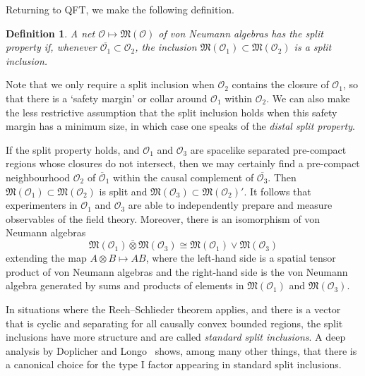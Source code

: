 \documentclass[12pt,a4paper]{article}
\newcommand{\1}{\mathds{1}}                         %
\newcommand{\Ocal}{\mathcal{O}}
\newcommand{\Mf}{{\mathfrak{M}}}
\newtheorem{definition}[theorem]{Definition}
\begin{document}
Returning to QFT, we make the following definition.
\begin{definition}
	A net $\Ocal\mapsto\Mf(\Ocal)$ of von Neumann algebras has the \emph{split property} if, whenever $\overline{\Ocal_1}\subset \Ocal_2$, the inclusion $\Mf(\Ocal_1)\subset \Mf(\Ocal_2)$ is a split inclusion. 
\end{definition}
Note that we only require a split inclusion when $\Ocal_2$ contains the closure of $\Ocal_1$, so that there is a `safety margin' or collar around $\Ocal_1$ within $\Ocal_2$. We can also make the less restrictive assumption that the split inclusion holds when this safety margin has a minimum size, in which case one speaks of the \emph{distal split property}. 

If the split property holds, and $\Ocal_1$ and $ \Ocal_3$ are spacelike separated pre-compact regions whose closures do not intersect, then we may certainly find a pre-compact neighbourhood $\Ocal_2$ of $\overline{\Ocal}_1$ within the causal complement of $\overline{\Ocal_3}$. Then $\Mf(\Ocal_1)\subset \Mf(\Ocal_2)$ is split and $\Mf( \Ocal_3)\subset \Mf(\Ocal_2)'$. It follows that experimenters in $\Ocal_1$ and $ \Ocal_3$ are able to independently prepare and measure observables of the field theory. Moreover, there is an isomorphism of von Neumann algebras
\[
\Mf(\Ocal_1)\bar{\otimes}\Mf( \Ocal_3)\cong \Mf(\Ocal_1)\vee \Mf( \Ocal_3)
\]
extending the map $A\otimes B\mapsto AB$, 
where the left-hand side is a spatial tensor product of von Neumann algebras and the right-hand side is the von Neumann algebra generated by sums and products of elements in $\Mf(\Ocal_1)$ and $\Mf(\Ocal_3)$.

In situations where the Reeh--Schlieder theorem applies, and there is a vector that is cyclic and separating for all causally convex bounded regions, the split inclusions have more structure and are called \emph{standard split inclusions}. A deep analysis by Doplicher and Longo~\cite{DopLon:1984} shows, among many other things, that there is a canonical choice for the type I factor appearing in standard split inclusions. 
\end{document}
